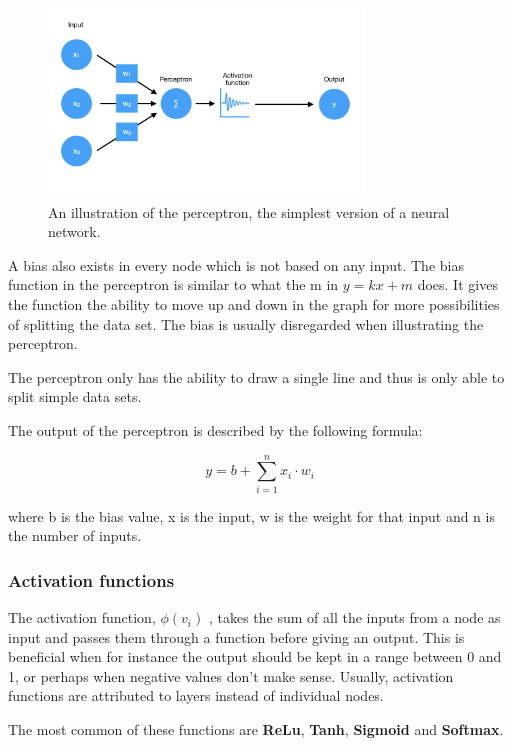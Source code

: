 \begin{figure}[hbtp]
\begin{center}
\includegraphics[width = 0.75\textwidth]{./Images/perceptron.jpg} 
\caption{An illustration of the perceptron, the simplest version of a neural network.}
\end{center}
\end{figure}

A bias also exists in every node which is not based on any input. The bias function in the perceptron is similar to what the m in $y = kx + m$ does. It gives the function the ability to move up and down in the graph for more possibilities of splitting the data set. The bias is usually disregarded when illustrating the perceptron.

The perceptron only has the ability to draw a single line and thus is only able to split simple data sets.

The output of the perceptron is described by the following formula:

\[ y = b + \displaystyle\sum_{i=1}^{n} x_i \cdot w_i \]

where b is the bias value, x is the input, w is the weight for that input and n is the number of inputs.

\subsubsection{Activation functions}

The activation function,  $ \phi (v_{i}) $ , takes the sum of all the inputs from a node as input and passes them through a function before giving an output. This is beneficial when for instance the output should be kept in a range between 0 and 1, or perhaps when negative values don't make sense.
Usually, activation functions are attributed to layers instead of individual nodes.

The most common of these functions are \textbf{ReLu}, \textbf{Tanh}, \textbf{Sigmoid} and \textbf{Softmax}.

